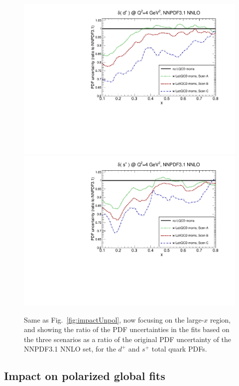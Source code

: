 \begin{figure}[!t]
\centering
\includegraphics[scale=0.45]{plots/xdp-unpol-lattice-relerr-largex.pdf}
\includegraphics[scale=0.45]{plots/xsp-unpol-lattice-relerr-largex.pdf}
\caption{\small Same as Fig.~\ref{fig:impactUnpol}, now focusing
  on the large-$x$ region, and showing the ratio of the
  PDF uncertainties in the fits based on the three scenarios
  as a ratio of the original
  PDF uncertainty of the NNPDF3.1 NNLO set, for the $d^+$
  and $s^+$ total quark PDFs.
}    
\label{fig:impactUnpollargex}
\end{figure}

\subsection{Impact on polarized global fits}

